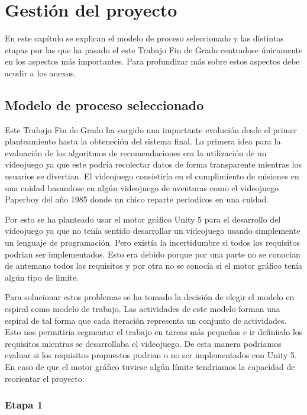 \chapter{Gestión del proyecto}


En este capítulo se explican el modelo de proceso seleccionado y las distintas etapas por las que ha pasado el este Trabajo Fin de Grado centradose únicamente en los aspectos más importantes. Para profundizar más sobre estos aspectos debe acudir a los anexos.

\section{Modelo de proceso seleccionado}


Este Trabajo Fin de Grado ha surgido una importante evolución desde el primer planteamiento hasta la obteneción del sistema final. La primera idea para la evaluación de los algoritmos de recomendaciones era la utilización de un videojuego ya que este podría recolectar datos de forma transparente mientras los usuarios se divertian. El videojuego consistiría en el cumplimiento de misiones en una cuidad basandose en algún videojuego de aventuras como el videojuego Paperboy del año 1985 donde un chico reparte periodicos en una cuidad.

Por esto se ha planteado usar el motor gráfico Unity 5 para el desarrollo del videojuego ya que no tenía sentido desarrollar un videojuego usando simplemente un lenguaje de programación. Pero existía la incertidumbre si todos los requisitos podrian ser implementados. Esto era debido porque por una parte no se conocian de antemano todos los requisitos y por otra no se conocía si el motor gráfico tenía algún tipo de limite. 

Para solucionar estos problemas se ha tomado la decisión de elegir el modelo en espiral como modelo de trabajo. Las actividades de este modelo forman una espiral de tal forma que cada iteración representa un conjunto de actividades. Esto nos permitiría segmentar el trabajo en tareas más pequeñas e ir definiedo los requisitos mientras se desarrollaba el videojuego. De esta manera podriamos evaluar si los requisitos propuestos podrian o no ser implementados con Unity 5. En caso de que el motor gráfico tuviese algún límite tendriamos la capacidad de reorientar el proyecto.

\subsection{Etapa 1}

